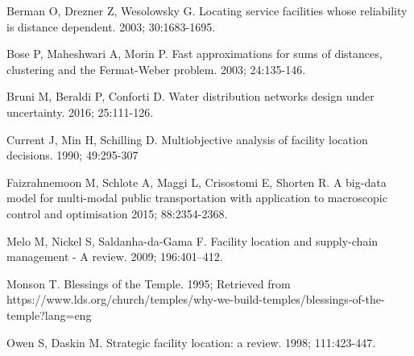 \documentclass[twoside,twocolumn]{article}
\begin{document}
\begin{thebibliography}{99}

Berman O, Drezner Z, Wesolowsky G.
\newblock Locating service facilities whose reliability is distance dependent.
 2003; 30:1683-1695.

Bose P, Maheshwari A, Morin P.
\newblock Fast approximations for sums of distances, clustering and the Fermat-Weber problem.
 2003; 24:135-146.

Bruni M, Beraldi P, Conforti D.
\newblock Water distribution networks design under uncertainty.
 2016; 25:111-126.

Current J, Min H, Schilling D.
\newblock Multiobjective analysis of facility location decisions.
 1990; 49:295-307

Faizrahnemoon M, Schlote A, Maggi L, Crisostomi E, Shorten R.
\newblock A big-data model for multi-modal public transportation with application to macroscopic control and optimisation
 2015; 88:2354-2368.

Melo M, Nickel S, Saldanha-da-Gama F.
\newblock Facility location and supply-chain management - A review.
  2009; 196:401--412.

Monson T.
\newblock Blessings of the Temple. 1995;
\newblock Retrieved from https://www.lds.org/church/temples/why-we-build-temples/blessings-of-the-temple?lang=eng

Owen S, Daskin M.
\newblock Strategic facility location: a review.
 1998; 111:423-447.

\end{thebibliography}
\end{document}
